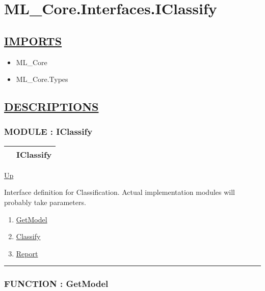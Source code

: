 \chapter*{ML\_Core.Interfaces.IClassify}
\hypertarget{ecldoc:toc:ML_Core.Interfaces.IClassify}{}

\section*{\underline{IMPORTS}}
\begin{itemize}
\item ML\_Core
\item ML\_Core.Types
\end{itemize}

\section*{\underline{DESCRIPTIONS}}
\subsection*{MODULE : IClassify}
\hypertarget{ecldoc:ML_Core.Interfaces.IClassify}{}

{\renewcommand{\arraystretch}{1.5}
\begin{tabularx}{\textwidth}{|>{\raggedright\arraybackslash}l|X|}
\hline
\hspace{0pt} & IClassify \\
\hline
\end{tabularx}
}

\hyperlink{ecldoc:toc:ML_Core/Interfaces}{Up}

\par
Interface definition for Classification. Actual implementation modules will probably take parameters.


\begin{enumerate}
\item \hyperlink{ecldoc:ml_core.interfaces.iclassify.getmodel}{GetModel}
\item \hyperlink{ecldoc:ml_core.interfaces.iclassify.classify}{Classify}
\item \hyperlink{ecldoc:ml_core.interfaces.iclassify.report}{Report}
\end{enumerate}

\rule{\textwidth}{0.4pt}

\subsection*{FUNCTION : GetModel}
\hypertarget{ecldoc:ml_core.interfaces.iclassify.getmodel}{}

